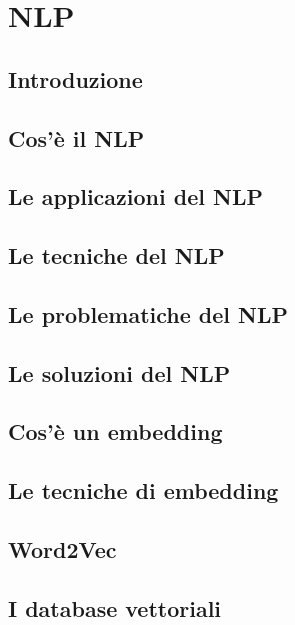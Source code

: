 \chapter{NLP}\label{NLP}
\section{Introduzione}
\section{Cos'è il NLP}
\section{Le applicazioni del NLP}
\section{Le tecniche del NLP}
\section{Le problematiche del NLP}
\section{Le soluzioni del NLP}
\section{Cos'è un embedding}
\section{Le tecniche di embedding}
\section{Word2Vec}
\section{I database vettoriali}
